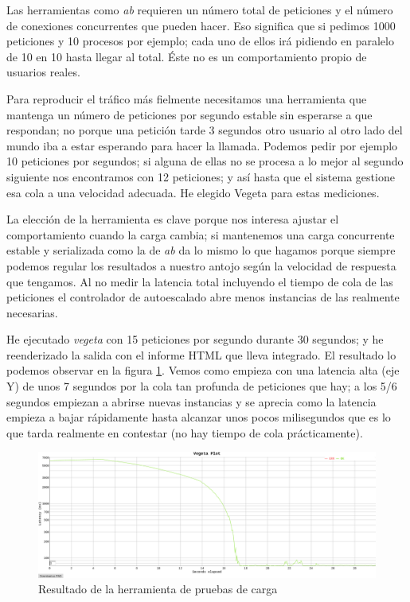 Las herramientas como \emph{ab} requieren un número total de peticiones y el número de conexiones concurrentes que pueden hacer. Eso significa que si pedimos 1000 peticiones y 10 procesos por ejemplo; cada uno de ellos irá pidiendo en paralelo de 10 en 10 hasta llegar al total. Éste no es un comportamiento propio de usuarios reales.

Para reproducir el tráfico más fielmente necesitamos una herramienta que mantenga un número de peticiones por segundo estable sin esperarse a que respondan; no porque una petición tarde 3 segundos otro usuario al otro lado del mundo iba a estar esperando para hacer la llamada. Podemos pedir por ejemplo 10 peticiones por segundos; si alguna de ellas no se procesa a lo mejor al segundo siguiente nos encontramos con 12 peticiones; y así hasta que el sistema gestione esa cola a una velocidad adecuada. He elegido Vegeta\cite{vegeta} para estas mediciones.

La elección de la herramienta es clave porque nos interesa ajustar el comportamiento cuando la carga cambia; si mantenemos una carga concurrente estable y serializada como la de \emph{ab} da lo mismo lo que hagamos porque siempre podemos regular los resultados a nuestro antojo según la velocidad de respuesta que tengamos. Al no medir la latencia total incluyendo el tiempo de cola de las peticiones el controlador de autoescalado abre menos instancias de las realmente necesarias.

He ejecutado \emph{vegeta} con 15 peticiones por segundo durante 30 segundos; y he reenderizado la salida con el informe HTML que lleva integrado. El resultado lo podemos observar en la figura \ref{fig:vegeta-plot}. Vemos como empieza con una latencia alta (eje Y) de unos 7 segundos por la cola tan profunda de peticiones que hay; a los 5/6 segundos empiezan a abrirse nuevas instancias y se aprecia como la latencia empieza a bajar rápidamente hasta alcanzar unos pocos milisegundos que es lo que tarda realmente en contestar (no hay tiempo de cola prácticamente).

\begin{figure}[H]
    \centering
    \includegraphics[width=\textwidth]{../images/fnapi/vegeta-plot.png}
    \caption{Resultado de la herramienta de pruebas de carga}
    \label{fig:vegeta-plot}
\end{figure}

